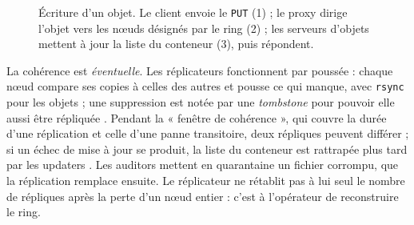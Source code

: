 \begin{figure}[!ht]
\centering
{}
\caption{Écriture d'un objet. Le client envoie le \texttt{PUT} (1) ; le proxy dirige l'objet vers les nœuds désignés par le
ring (2) ; les serveurs d'objets mettent à jour la liste du conteneur (3), puis répondent.}
\label{fig:sw-put}
\end{figure}

La cohérence est \emph{éventuelle}. Les réplicateurs fonctionnent par poussée : chaque nœud compare ses copies à celles des
autres et pousse ce qui manque, avec \texttt{rsync} pour les objets ; une suppression est notée par une \emph{tombstone}
pour pouvoir elle aussi être répliquée \parencite{swift-replication}. Pendant la « fenêtre de cohérence », qui couvre la durée
d'une réplication et celle d'une panne transitoire, deux répliques peuvent différer ; si un échec de mise à jour se produit,
la liste du conteneur est rattrapée plus tard par les updaters \parencite{swift-architecture, swift-replication}. Les
auditors mettent en quarantaine un fichier corrompu, que la réplication remplace ensuite. Le réplicateur ne rétablit pas à
lui seul le nombre de répliques après la perte d'un nœud entier \parencite{swift-replication} : c'est à l'opérateur de
reconstruire le ring.


